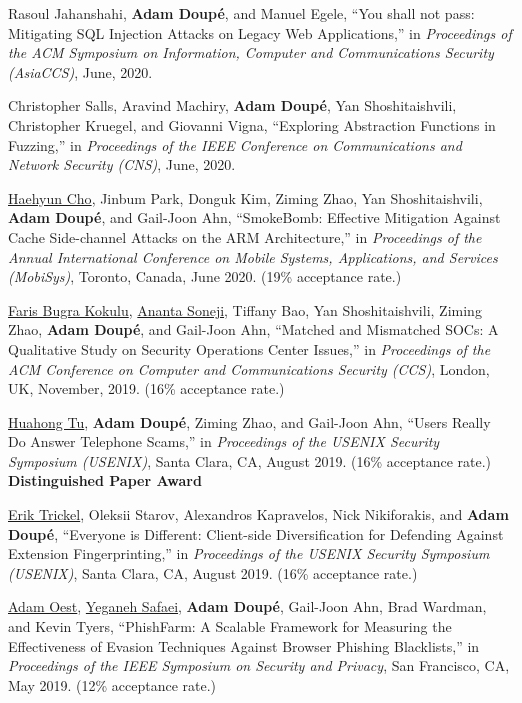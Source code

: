 \documentclass[11pt,letterpaper,sans]{moderncv}
\begin{document}
\begin{etaremune}
\item Rasoul Jahanshahi, \textbf{Adam Doup\'e}, and Manuel Egele, ``You shall not pass: Mitigating SQL Injection Attacks on Legacy Web Applications,'' in \emph{Proceedings of the ACM Symposium on Information, Computer and Communications Security (AsiaCCS)}, June, 2020.

\item Christopher Salls, Aravind Machiry, \textbf{Adam Doup\'e}, Yan Shoshitaishvili, Christopher Kruegel, and Giovanni Vigna, ``Exploring Abstraction Functions in Fuzzing,'' in \emph{Proceedings of the IEEE Conference on Communications and Network Security (CNS)}, June, 2020.

\item \underline{Haehyun Cho}, Jinbum Park, Donguk Kim, Ziming Zhao, Yan Shoshitaishvili, \textbf{Adam Doup\'e}, and Gail-Joon Ahn, ``SmokeBomb: Effective Mitigation Against Cache Side-channel Attacks on the ARM Architecture,'' in \emph{Proceedings of the Annual International Conference on Mobile Systems, Applications, and Services (MobiSys)}, Toronto, Canada, June 2020. (19\% acceptance rate.)

\item \underline{Faris Bugra Kokulu}, \underline{Ananta Soneji}, Tiffany Bao, Yan Shoshitaishvili, Ziming Zhao, \textbf{Adam Doup\'e}, and Gail-Joon Ahn, ``Matched and Mismatched SOCs: A Qualitative Study on Security Operations Center Issues,'' in \emph{Proceedings of the ACM Conference on Computer and Communications Security (CCS)}, London, UK, November, 2019. (16\% acceptance rate.)

\item \underline{Huahong Tu}, \textbf{Adam Doup\'e}, Ziming Zhao, and Gail-Joon Ahn, ``Users Really Do Answer Telephone Scams,'' in \emph{Proceedings of the USENIX Security Symposium (USENIX)}, Santa Clara, CA, August 2019. (16\% acceptance rate.) \\
  \textbf{Distinguished Paper Award}

\item \underline{Erik Trickel}, Oleksii Starov, Alexandros Kapravelos, Nick Nikiforakis, and \textbf{Adam Doup\'e}, ``Everyone is Different: Client-side Diversification for Defending Against Extension Fingerprinting,'' in \emph{Proceedings of the USENIX Security Symposium (USENIX)}, Santa Clara, CA, August 2019. (16\% acceptance rate.)

\item \underline{Adam Oest}, \underline{Yeganeh Safaei}, \textbf{Adam Doup\'e}, Gail-Joon Ahn, Brad Wardman, and Kevin Tyers, ``PhishFarm: A Scalable Framework for Measuring the Effectiveness of Evasion Techniques Against Browser Phishing Blacklists,'' in \emph{Proceedings of the IEEE Symposium on Security and Privacy}, San Francisco, CA, May 2019. (12\% acceptance rate.)


\end{etaremune}
\end{document}
